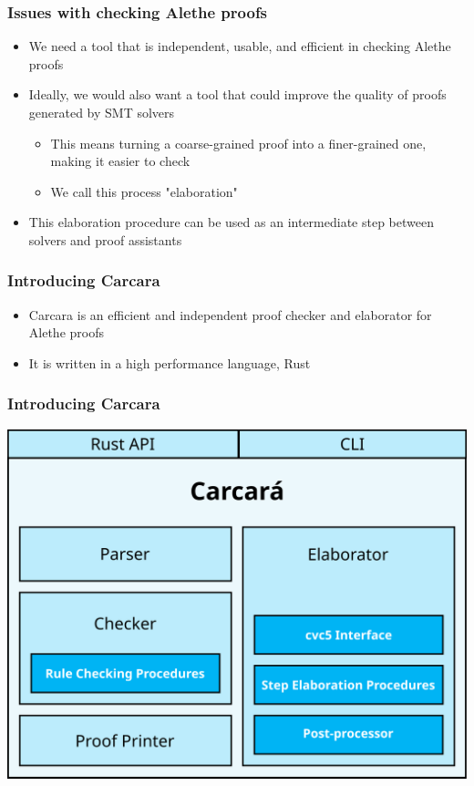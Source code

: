 \documentclass[usepdftitle=false,aspectratio=169]{beamer}
\newcommand\vitem{\vfill\item}
\begin{document}
\begin{frame}
  \frametitle{Issues with checking Alethe proofs}
  \begin{itemize}
    \vitem We need a tool that is independent, usable, and efficient in checking
    Alethe proofs
    \vitem Ideally, we would also want a tool that could improve the quality of
    proofs generated by SMT solvers
    \begin{itemize}
      \item This means turning a coarse-grained proof into a finer-grained
        one, making it easier to check
      \item We call this process "elaboration"
    \end{itemize}
    \vitem This elaboration procedure can be used as an intermediate step
    between solvers and proof assistants
  \end{itemize}
\end{frame}

\begin{frame}
  \frametitle{Introducing Carcara}
  \begin{itemize}
    \vitem Carcara is an efficient and independent proof checker and elaborator
    for Alethe proofs
    \vitem It is written in a high performance language, Rust
  \end{itemize}
\end{frame}

\begin{frame}
  \frametitle{Introducing Carcara}
  \centering
  \includegraphics[height=0.8\textheight]{images/architecture.png}
\end{frame}
\end{document}
